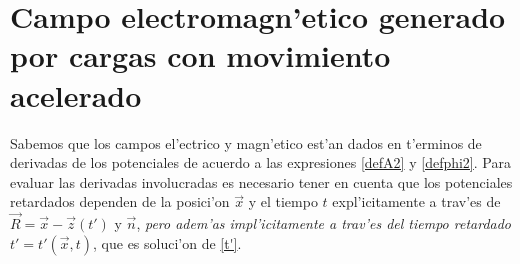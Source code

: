 \section{Campo electromagn'etico generado por cargas con movimiento acelerado}
\begin{figure}[ht]
\centerline{} \caption{}
\label{R7}
\end{figure}
Sabemos que los campos el'ectrico y magn'etico est'an dados en t'erminos de derivadas de los potenciales de acuerdo a las expresiones \eqref{defA2} y \eqref{defphi2}. Para evaluar las derivadas involucradas es necesario tener en cuenta que los potenciales retardados dependen de la posici'on $\vec{x}$ y el tiempo $t$ expl'icitamente a trav'es de $\vec{R}=\vec{x}-\vec{z}(t')$ y $\vec{n}$, \textit{pero adem'as impl'icitamente a trav'es del tiempo retardado} $t'=t'(\vec{x},t)$, que es soluci'on de \eqref{t'}.

